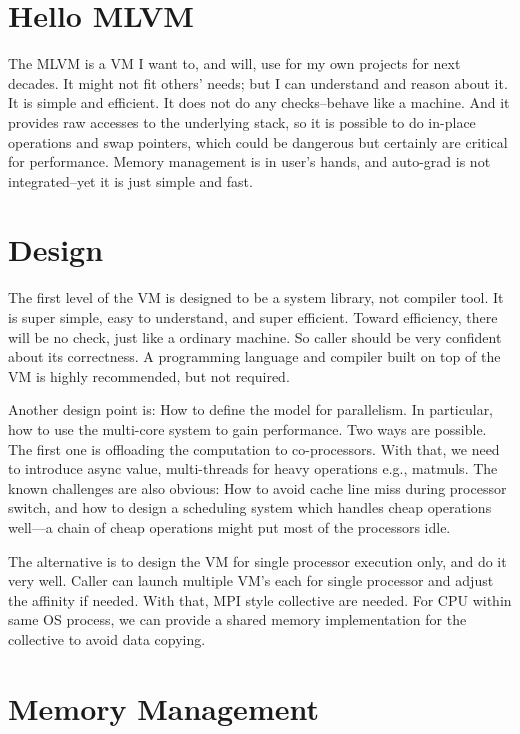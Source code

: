 \hsize=5in
\vsize=7in


\section{Hello MLVM}

The MLVM is a VM I want to, and will, use for my own projects for next decades.
It might not fit others' needs; but I can understand and reason about it. It is
simple and efficient. It does not do any checks--behave like a machine. And it
provides raw accesses to the underlying stack, so it is possible to do in-place
operations and swap pointers, which could be dangerous but certainly are
critical for performance. Memory management is in user's hands, and auto-grad is
not integrated--yet it is just simple and fast.


\section{Design}

The first level of the VM is designed to be a system library, not compiler tool.
It is super simple, easy to understand, and super efficient. Toward efficiency,
there will be no check, just like a ordinary machine. So caller should be very
confident about its correctness. A programming language and compiler built on
top of the VM is highly recommended, but not required.

Another design point is: How to define the model for parallelism. In particular,
how to use the multi-core system to gain performance. Two ways are possible. The
first one is offloading the computation to co-processors. With that, we need to
introduce async value, multi-threads for heavy operations e.g., matmuls. The
known challenges are also obvious: How to avoid cache line miss during processor
switch, and how to design a scheduling system which handles cheap operations
well---a chain of cheap operations might put most of the processors idle.

The alternative is to design the VM for single processor execution only, and do
it very well. Caller can launch multiple VM's each for single processor and
adjust the affinity if needed. With that, MPI style collective are needed. For
CPU within same OS process, we can provide a shared memory implementation for
the collective to avoid data copying.

\section{Memory Management}

